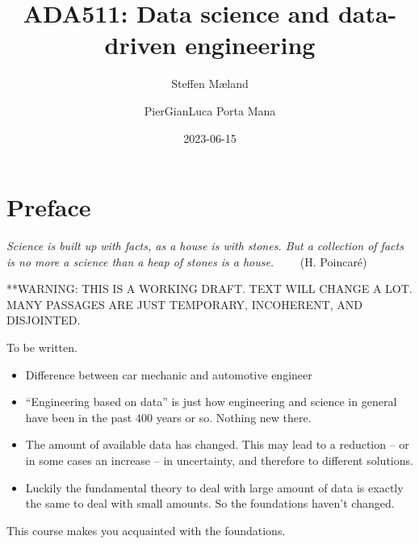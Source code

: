 \documentclass[
  a4paper,
  DIV=11,
  numbers=noendperiod,
  oneside]{scrreprt}
\title{ADA511: Data science and data-driven engineering}
\author{Steffen Mæland \and PierGianLuca Porta Mana}
\date{2023-06-15}
\renewcommand*\contentsname{Table of contents}
\newcommand\contentsname{Table of contents}
\begin{document}
\maketitle
\ifdefined\Shaded\renewenvironment{Shaded}{\begin{tcolorbox}[borderline west={3pt}{0pt}{shadecolor}, sharp corners, interior hidden, breakable, frame hidden, enhanced, boxrule=0pt]}{\end{tcolorbox}}\fi

\renewcommand*\contentsname{Table of contents}
{
\hypersetup{linkcolor=}
\setcounter{tocdepth}{2}
\tableofcontents
}

\hypertarget{preface}{%
\chapter*{Preface}\label{preface}}


\hfill\break
\hfill\break
\hfill\break
\hfill\break
\hfill\break
\hfill\break

\emph{Science is built up with facts, as a house is with stones. But a
collection of facts is no more a science than a heap of stones is a
house.} ~~~~{(H. Poincaré)}

**WARNING: THIS IS A WORKING DRAFT. TEXT WILL CHANGE A LOT. MANY
PASSAGES ARE JUST TEMPORARY, INCOHERENT, AND DISJOINTED.

To be written.

\begin{itemize}
\item
  Difference between car mechanic and automotive engineer
\item
  ``Engineering based on data'' is just how engineering and science in
  general have been in the past 400 years or so. Nothing new there.
\item
  The amount of available data has changed. This may lead to a reduction
  -- or in some cases an increase -- in uncertainty, and therefore to
  different solutions.
\item
  Luckily the fundamental theory to deal with large amount of data is
  exactly the same to deal with small amounts. So the foundations
  haven't changed.
\end{itemize}

This course makes you acquainted with the foundations.

\end{document}
